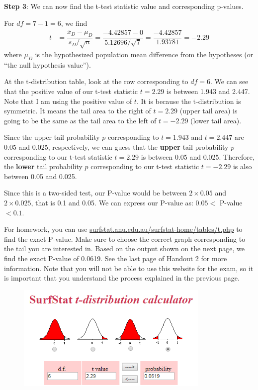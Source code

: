 \documentclass[12pt]{article}
\begin{document}
\noindent \textbf{Step 3}: We can now find the t-test statistic value and corresponding p-values. 

For $df = 7 - 1 = 6$, we find
\begin{align*}
t &= \dfrac{\bar{x}_D - \mu_D}{s_D / \sqrt{n}} 
= \dfrac{-4.42857 - 0}{5.12696 / \sqrt{7}}
= \dfrac{-4.42857}{1.93781}
= -2.29
\end{align*}
where $\mu_D$ is the hypothesized population mean difference from the hypotheses (or ``the null hypothesis value'').

At the t-distribution table, look at the row corresponding to $df = 6$. We can see that the positive value of our t-test statistic $t = 2.29$ is between 1.943 and 2.447. Note that I am using the positive value of $t$. It is because the t-distribution is symmetric. It means the tail area to the right of $t = 2.29$ (upper tail area) is going to be the same as the tail area to the left of $t = -2.29$ (lower tail area). 

Since the upper tail probability $p$ corresponding to $t = 1.943$ and $t = 2.447$ are 0.05 and 0.025, respectively, we can guess that the \textbf{upper} tail probability $p$ corresponding to our t-test statistic $t = 2.29$ is between 0.05 and 0.025. Therefore, the \textbf{lower} tail probability $p$ corresponding to our t-test statistic $t = -2.29$ is also between 0.05 and 0.025.

Since this is a two-sided test, our P-value would be between $2 \times 0.05$ and $2 \times 0.025$, that is 0.1 and 0.05. We can express our P-value as: $0.05 <$ P-value $< 0.1$.

For homework, you can use \url{surfstat.anu.edu.au/surfstat-home/tables/t.php} to find the exact P-value. Make sure to choose the correct graph corresponding to the tail you are interested in. Based on the output shown on the next page, we find the exact P-value of 0.0619. See the last page of Handout 2 for more information. Note that you will not be able to use this website for the exam, so it is important that you understand the process explained in the previous page.

\begin{figure}[!h]
	\centering
	\includegraphics[width=9.25cm]{Figures/fig2.png}
	\vspace{-5 pt}
\end{figure}
\end{document}
